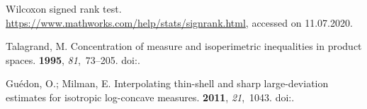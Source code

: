 \documentclass[entropy,article,submit,moreauthors,pdftex]{Definitions/mdpi}
\begin{document}
\begin{thebibliography}{-------}
Wilcoxon signed rank test.
\newblock \url{https://www.mathworks.com/help/stats/signrank.html}, accessed on
  11.07.2020.

Talagrand, M.
\newblock Concentration of measure and isoperimetric inequalities in product
  spaces.
 {\bf 1995}, {\em 81},~73--205.
\newblock
  doi:{\href{https://doi.org/10.1007/BF02699376}{}}.

Gu\'{e}don, O.; Milman, E.
\newblock Interpolating thin-shell and sharp large-deviation estimates for
  isotropic log-concave measures.
 {\bf 2011}, {\em 21},~1043.
\newblock
  doi:{\href{https://doi.org/10.1007/s00039-011-0136-5}{}}.

\end{thebibliography}



\end{document}
